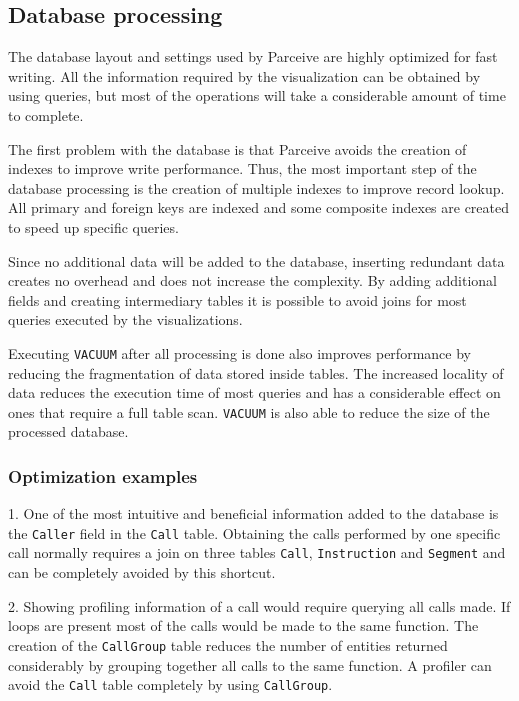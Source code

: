 \documentclass[conference]{IEEEtran}
\begin{document}
\subsection{Database processing}
\label{dataprocessing}

The database layout and settings used by Parceive are highly optimized for fast writing. All the information required by the visualization can be obtained by using queries, but most of the operations will take a considerable amount of time to complete.

The first problem with the database is that Parceive avoids the creation of indexes to improve write performance. Thus, the most important step of the database processing is the creation of multiple indexes to improve record lookup. All primary and foreign keys are indexed and some composite indexes are created to speed up specific queries.

Since no additional data will be added to the database, inserting redundant data creates no overhead and does not increase the complexity. By adding additional fields and creating intermediary tables it is possible to avoid joins for most queries executed by the visualizations. 

Executing \texttt{VACUUM} after all processing is done also improves performance by reducing the fragmentation of data stored inside tables. The increased locality of data reduces the execution time of most queries and has a considerable effect on ones that require a full table scan. \texttt{VACUUM} is also able to reduce the size of the processed database.

\subsubsection{Optimization examples}

1. One of the most intuitive and beneficial information added to the database is the \texttt{Caller} field in the \texttt{Call} table. Obtaining the calls performed by one specific call normally requires a join on three tables \texttt{Call}, \texttt{Instruction} and \texttt{Segment} and can be completely avoided by this shortcut.

2. Showing profiling information of a call would require querying all calls made. If loops are present most of the calls would be made to the same function. The creation of the \texttt{CallGroup} table reduces the number of entities returned considerably by grouping together all calls to the same function. A profiler can avoid the \texttt{Call} table completely by using \texttt{CallGroup}.
\end{document}
